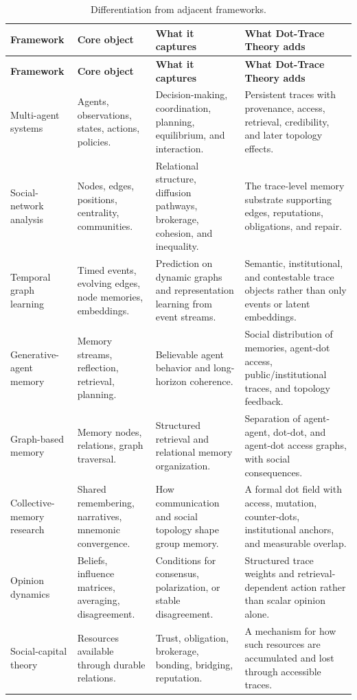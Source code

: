 \documentclass[11pt]{article}
\theoremstyle{remark}
\begin{document}
\begin{longtable}[]{@{}
  >{\raggedright\arraybackslash}p{}
  >{\raggedright\arraybackslash}p{}
  >{\raggedright\arraybackslash}p{}
  >{\raggedright\arraybackslash}p{}@{}}
\caption{Differentiation from adjacent frameworks.}\label{tab:differentiation-adjacent}\\
\toprule
\textbf{Framework} & \textbf{Core object} & \textbf{What it captures} & \textbf{What Dot-Trace Theory adds}\\
\midrule
\endfirsthead
\toprule
\textbf{Framework} & \textbf{Core object} & \textbf{What it captures} & \textbf{What Dot-Trace Theory adds}\\
\midrule
\endhead
Multi-agent systems & Agents, observations, states, actions, policies. & Decision-making, coordination, planning, equilibrium, and interaction. & Persistent traces with provenance, access, retrieval, credibility, and later topology effects.\\
Social-network analysis & Nodes, edges, positions, centrality, communities. & Relational structure, diffusion pathways, brokerage, cohesion, and inequality. & The trace-level memory substrate supporting edges, reputations, obligations, and repair.\\
Temporal graph learning & Timed events, evolving edges, node memories, embeddings. & Prediction on dynamic graphs and representation learning from event streams. & Semantic, institutional, and contestable trace objects rather than only events or latent embeddings.\\
Generative-agent memory & Memory streams, reflection, retrieval, planning. & Believable agent behavior and long-horizon coherence. & Social distribution of memories, agent-dot access, public/institutional traces, and topology feedback.\\
Graph-based memory & Memory nodes, relations, graph traversal. & Structured retrieval and relational memory organization. & Separation of agent-agent, dot-dot, and agent-dot access graphs, with social consequences.\\
Collective-memory research & Shared remembering, narratives, mnemonic convergence. & How communication and social topology shape group memory. & A formal dot field with access, mutation, counter-dots, institutional anchors, and measurable overlap.\\
Opinion dynamics & Beliefs, influence matrices, averaging, disagreement. & Conditions for consensus, polarization, or stable disagreement. & Structured trace weights and retrieval-dependent action rather than scalar opinion alone.\\
Social-capital theory & Resources available through durable relations. & Trust, obligation, brokerage, bonding, bridging, reputation. & A mechanism for how such resources are accumulated and lost through accessible traces.\\
\bottomrule
\end{longtable}
\end{document}
